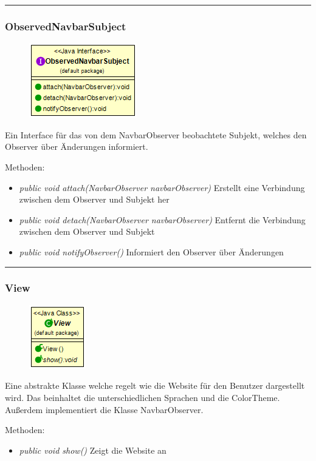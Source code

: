 \rule{\textwidth}{0.4pt}
\subsubsection{ObservedNavbarSubject}
\begin{minipage}{0.3\textwidth}
    \begin{figure}[H]
        {\centering\includegraphics[scale = 0.6
        ]{media/view/view/ObservedNavbarSubject_Class.png}}
    \end{figure}
    \end{minipage} \hfill
    \begin{minipage}{0.6\textwidth}
Ein Interface für das von dem NavbarObserver beobachtete Subjekt, welches den Observer über Änderungen informiert.
\end{minipage}
Methoden: \begin{itemize} [noitemsep]
    \item \emph{public void attach(NavbarObserver navbarObserver)} Erstellt eine Verbindung zwischen dem Observer und Subjekt her
    \item \emph{public void detach(NavbarObserver navbarObserver)} Entfernt die Verbindung zwischen dem Observer und Subjekt
    \item \emph{public void notifyObserver()} Informiert den Observer über Änderungen
\end{itemize}

\rule{\textwidth}{0.4pt}
\subsubsection{View}
\begin{minipage}{0.3\textwidth}
    \begin{figure}[H]
        {\centering\includegraphics[scale = 0.7
        ]{media/view/view/View_Class.png}}
    \end{figure}
    \end{minipage} \hfill
    \begin{minipage}{0.6\textwidth}
Eine abstrakte Klasse welche regelt wie die Website für den Benutzer dargestellt wird. Das beinhaltet die unterschiedlichen Sprachen und die ColorTheme. Außerdem implementiert die Klasse NavbarObserver.
\end{minipage}
Methoden: \begin{itemize} [noitemsep]
    \item \emph{public void show()} Zeigt die Website an
\end{itemize}

